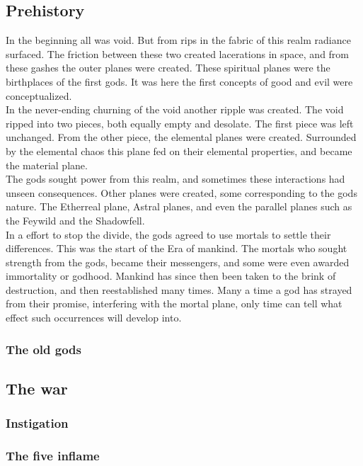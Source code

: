 \documentclass[a4paper]{book}
\begin{document}
\subsection{Prehistory}
In the beginning all was void. But from rips in the fabric of this realm radiance surfaced. The friction between these two created lacerations in space, and from these gashes the outer planes were created. These spiritual planes were the birthplaces of the first gods. It was here the first concepts of good and evil were conceptualized.\\
In the never-ending churning of the void another ripple was created. The void ripped into two pieces, both equally empty and desolate. The first piece was left unchanged. From the other piece, the elemental planes were created. Surrounded by the elemental chaos this plane fed on their elemental properties, and became the material plane.\\
The gods sought power from this realm, and sometimes these interactions had unseen consequences. Other planes were created, some corresponding to the gods nature. The Etherreal plane, Astral planes, and even the parallel planes such as the Feywild and the Shadowfell.\\
In a effort to stop the divide, the gods agreed to use mortals to settle their differences. This was the start of the Era of mankind. The mortals who sought strength from the gods, became their messengers, and some were even awarded immortality or godhood. Mankind has since then been taken to the brink of destruction, and then reestablished many times. Many a time a god has strayed from their promise, interfering with the mortal plane, only time can tell what effect such occurrences will develop into.

\subsubsection{The old gods}

\subsection{The war}

\subsubsection{Instigation}

\subsubsection{The five inflame}
\end{document}
